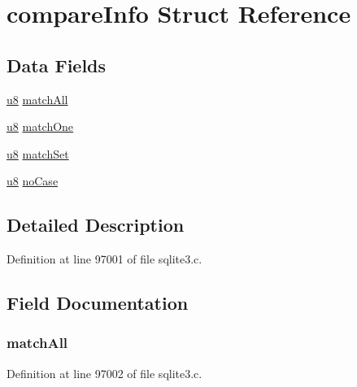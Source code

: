 \hypertarget{structcompare_info}{}\section{compare\+Info Struct Reference}
\label{structcompare_info}
\subsection*{Data Fields}
\begin{DoxyCompactItemize}
\item 
\hyperlink{sqlite3_8c_a74a0f6424ae628af25f23f0a35f6ead3}{u8} \hyperlink{structcompare_info_addc1bf7eaf1fe9f41311202f65164e28}{match\+All}
\item 
\hyperlink{sqlite3_8c_a74a0f6424ae628af25f23f0a35f6ead3}{u8} \hyperlink{structcompare_info_a4ae1749bf3b674cfbbbed3c7a3e5f1bf}{match\+One}
\item 
\hyperlink{sqlite3_8c_a74a0f6424ae628af25f23f0a35f6ead3}{u8} \hyperlink{structcompare_info_a6fc78a6eb94f7330a73bdbdfca0b9d4c}{match\+Set}
\item 
\hyperlink{sqlite3_8c_a74a0f6424ae628af25f23f0a35f6ead3}{u8} \hyperlink{structcompare_info_adb8e657989ec8b8c76073415b0bcad5c}{no\+Case}
\end{DoxyCompactItemize}


\subsection{Detailed Description}


Definition at line 97001 of file sqlite3.\+c.



\subsection{Field Documentation}
\hypertarget{structcompare_info_addc1bf7eaf1fe9f41311202f65164e28}{}
\subsubsection[{match\+All}]{ match\+All}\label{structcompare_info_addc1bf7eaf1fe9f41311202f65164e28}


Definition at line 97002 of file sqlite3.\+c.

\hypertarget{structcompare_info_a4ae1749bf3b674cfbbbed3c7a3e5f1bf}{}
